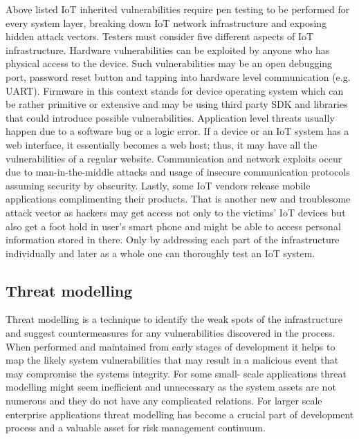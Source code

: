 Above listed IoT inherited vulnerabilities require pen testing to be performed for every system layer, breaking down IoT network infrastructure and exposing hidden attack vectors. Testers must consider five different aspects of IoT infrastructure. Hardware vulnerabilities can be exploited by anyone who has physical access to the device. Such vulnerabilities may be an open debugging port, password reset button and tapping into hardware level communication (e.g. UART)\cite{attify}. Firmware in this context stands for device operating system which can be rather primitive or extensive and may be using third party SDK and libraries that could introduce possible vulnerabilities\cite {cookbook}. Application level threats usually happen due to a software bug or a logic error\cite{cookbook}. If a device or an IoT system has a web interface, it essentially becomes a web host; thus, it may have all the vulnerabilities of a regular website\cite{2007:WAH:1406550}. Communication and network exploits occur due to man-in-the-middle attacks and usage of insecure communication protocols assuming security by obscurity. Lastly, some IoT vendors release mobile applications complimenting their products. That is another new and troublesome attack vector as hackers may get access not only to the victims’ IoT devices but also get a foot hold in user’s smart phone and might be able to access personal information stored in there\cite{cookbook}. Only by addressing each part of the infrastructure individually and later as a whole one can thoroughly test an IoT system.

\subsection{Threat modelling}\label{iot-threat-modelling}

Threat modelling is a technique to identify the weak spots of the infrastructure and suggest countermeasures for any vulnerabilities discovered in the process. When performed and maintained from early stages of development it helps to map the likely system vulnerabilities that may result in a malicious event that may compromise the systems integrity\cite{threat-model-survey}. For some small- scale applications threat modelling might seem inefficient and unnecessary as the system assets are not numerous and they do not have any complicated relations. For larger scale enterprise applications threat modelling has become a crucial part of development process and a valuable asset for risk management continuum\cite{4420064}. 


